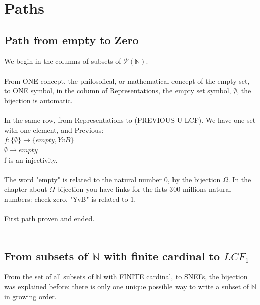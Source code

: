 \chapter{Paths}

	\section{Path from empty to Zero}
	
		\noindent
		We begin in the columns of subsets of $\mathcal{P(\mathbb{N})}$.
		\\\\
		
		\noindent
		From ONE concept, the philosofical, or mathematical concept of the empty set, to ONE symbol, in the column of Representations, the empty set symbol, $\emptyset$, the bijection is automatic.
		\\\\
		
		\noindent
		In the same row, from Representations to (PREVIOUS U LCF). We have one set with one element, and Previous: \\
		$f: \{ \emptyset \} \longrightarrow \{empty, YvB\}$ \\
		$\emptyset \rightarrow empty$\\
		f is an injectivity.
		\\\\
		
		\noindent
		The word "empty" is related to the natural number 0, by the bijection $\Omega$. In the chapter about $\Omega$ bijection you have links for the firts 300 millions natural numbers: check zero. "YvB" is related to 1.
		\\\\
		
		\noindent
		First path proven and ended.
		\\\\
		
	\section{ From subsets of $\mathbb{N}$ with finite cardinal to $LCF_{1}$ }
	
		\noindent
		From the set of all subsets of $\mathbb{N}$ with FINITE cardinal, to SNEFs, the bijection was explained before: there is only one unique possible way to write a subset of $\mathbb{N}$ in growing order.
		\\\\
		
